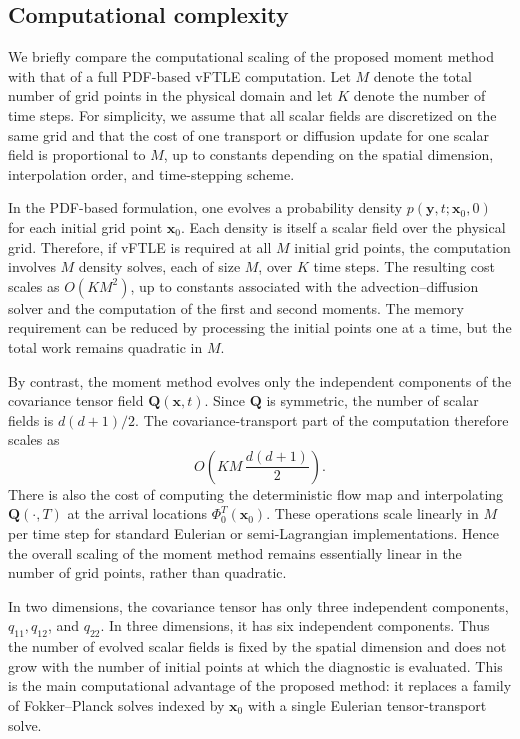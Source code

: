 \documentclass[a4paper,11pt]{article}
\numberwithin{equation}{section}
\theoremstyle{plain}
\theoremstyle{definition}
\theoremstyle{remark}
\newcommand{\bx}{\mathbf{x}}
\newcommand{\by}{\mathbf{y}}
\newcommand{\bQ}{\mathbf{Q}}
\newcommand{\flow}[2]{\Phi_{#1}^{#2}}
\begin{document}
\subsection{Computational complexity}

We briefly compare the computational scaling of the proposed moment method with that of a full PDF-based vFTLE computation.  Let \(M\) denote the total number of grid points in the physical domain and let \(K\) denote the number of time steps.  For simplicity, we assume that all scalar fields are discretized on the same grid and that the cost of one transport or diffusion update for one scalar field is proportional to \(M\), up to constants depending on the spatial dimension, interpolation order, and time-stepping scheme.

In the PDF-based formulation, one evolves a probability density \(p(\by,t;\bx_0,0)\) for each initial grid point \(\bx_0\).  Each density is itself a scalar field over the physical grid.  Therefore, if vFTLE is required at all \(M\) initial grid points, the computation involves \(M\) density solves, each of size \(M\), over \(K\) time steps.  The resulting cost scales as \(O(KM^2)\), up to constants associated with the advection--diffusion solver and the computation of the first and second moments.  The memory requirement can be reduced by processing the initial points one at a time, but the total work remains quadratic in \(M\).

By contrast, the moment method evolves only the independent components of the covariance tensor field \(\bQ(\bx,t)\).  Since \(\bQ\) is symmetric, the number of scalar fields is \(d(d+1)/2\).  The covariance-transport part of the computation therefore scales as
\[
    O\!\left(KM\,\frac{d(d+1)}{2}\right).
\]
There is also the cost of computing the deterministic flow map and interpolating \(\bQ(\cdot,T)\) at the arrival locations \(\flow{0}{T}(\bx_0)\).  These operations scale linearly in \(M\) per time step for standard Eulerian or semi-Lagrangian implementations.  Hence the overall scaling of the moment method remains essentially linear in the number of grid points, rather than quadratic.

In two dimensions, the covariance tensor has only three independent components, \(q_{11},q_{12}\), and \(q_{22}\).  In three dimensions, it has six independent components.  Thus the number of evolved scalar fields is fixed by the spatial dimension and does not grow with the number of initial points at which the diagnostic is evaluated.  This is the main computational advantage of the proposed method: it replaces a family of Fokker--Planck solves indexed by \(\bx_0\) with a single Eulerian tensor-transport solve.
\end{document}
